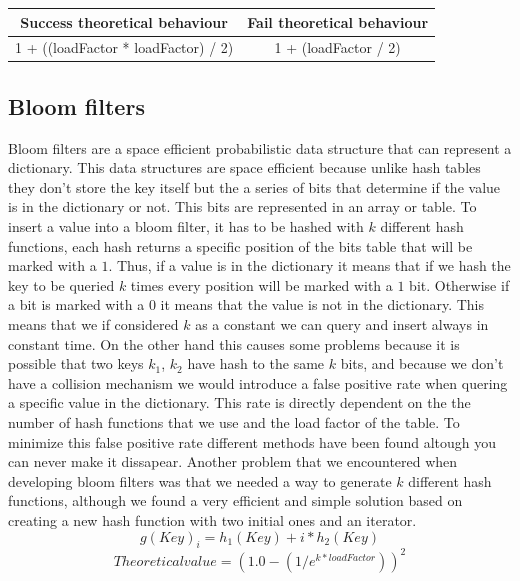 \documentclass{article}
\begin{document}
\begin{tabular}{c|c}
Success theoretical behaviour & Fail theoretical behaviour \\
\hline
1 + ((loadFactor * loadFactor) / 2) & 1 + (loadFactor / 2) \\
 
\end{tabular}
    
    \subsection{Bloom filters}
    Bloom filters \cite{ARTICLE:4} are a space efficient probabilistic data structure that can represent a dictionary. This data structures are space efficient because 
    unlike hash tables they don't store the key itself but the a series of bits that determine if the value is in the dictionary or not. This bits are represented in an array 
    or table. To insert a value into a bloom filter, it has to be hashed with $k$ different hash functions, each hash returns a specific position of the bits table that will be 
    marked with a $1$. Thus, if a value is in the dictionary it means that if we hash the key to be queried $k$ times every position will be marked with a $1$ bit. Otherwise 
    if a bit is marked with a $0$ it means that the value is not in the dictionary. This means that we if considered $k$ as a constant we can query and insert always in constant time. 
    On the other hand this causes some problems because it is possible that two keys $k_1$, $k_2$ have hash to the same $k$ bits, and because we don't have a collision mechanism we would introduce 
    a false positive rate when quering a specific value in the dictionary. This rate is directly dependent on the the number of hash functions that we use and the load factor of the table. 
    To minimize \cite{ARTICLE:1} this false positive rate different methods have been found altough you can never make it dissapear. Another problem that we encountered when developing bloom filters 
    was that we needed a way to generate $k$ different hash functions, although we found a very efficient and simple solution \cite{ARTICLE:3} based on creating a new hash function with two initial ones and 
    an iterator. 
    \begin{equation}
    g(Key)_i = h_1(Key) + i * h_2(Key)
    \end{equation}
    \begin{equation}
    Theoretical value = (1.0 - (1 / e^{k * loadFactor}))^2
    \end{equation}
    
\end{document}
